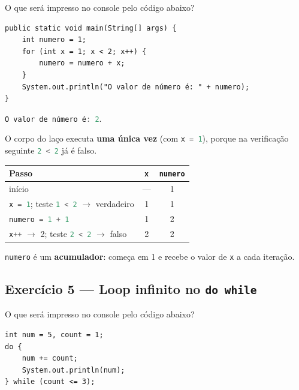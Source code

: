 \documentclass[12pt,a4paper]{article}
\newcommand{\codigo}[1]{\lstinline[language=Java,basicstyle=\ttfamily\small]|#1|}
\begin{document}
\begin{exercicio}
O que será impresso no console pelo código abaixo?

\begin{lstlisting}
public static void main(String[] args) {
    int numero = 1;
    for (int x = 1; x < 2; x++) {
        numero = numero + x;
    }
    System.out.println("O valor de número é: " + numero);
}
\end{lstlisting}
\end{exercicio}

\begin{resolucao}
\codigo{O valor de número é: 2}.

O corpo do laço executa \textbf{uma única vez} (com \codigo{x = 1}), porque na
verificação seguinte \codigo{2 < 2} já é falso.

\begin{center}
\begin{tabular}{l c c}
  \hline
  Passo & \codigo{x} & \codigo{numero} \\
  \hline
  início & --- & 1 \\
  \codigo{x = 1}; teste \codigo{1 < 2} $\rightarrow$ verdadeiro & 1 & 1 \\
  \codigo{numero = 1 + 1} & 1 & 2 \\
  \codigo{x++} $\rightarrow$ 2; teste \codigo{2 < 2} $\rightarrow$ falso & 2 & 2 \\
  \hline
\end{tabular}
\end{center}

\codigo{numero} é um \textbf{acumulador}: começa em 1 e recebe o valor de
\codigo{x} a cada iteração.
\end{resolucao}

\subsection{Exercício 5 --- Loop infinito no \texttt{do while}}

\begin{exercicio}
O que será impresso no console pelo código abaixo?

\begin{lstlisting}
int num = 5, count = 1;
do {
    num += count;
    System.out.println(num);
} while (count <= 3);
\end{lstlisting}
\end{exercicio}
\end{document}
